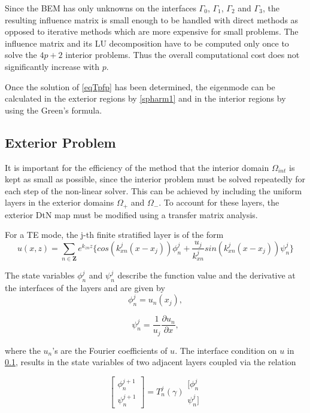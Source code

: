 Since the BEM has only unknowns on the interfaces $\Gamma_0$,
$\Gamma_1$, $\Gamma_2$ and $\Gamma_3$, the resulting influence matrix
is small enough to be handled with direct methods as opposed to
iterative methods which are more expensive for small problems. The
influence matrix and its LU decomposition have to be computed only
once to solve the $4p+2$ interior problems. Thus the overall
computational cost does not significantly increase with $p$.

Once the solution of \ref{eqTpfp} has been determined, the eigenmode can be
calculated in the exterior regions by \ref{spharm1} and in the interior
regions by using the Green's formula.

\subsection{Exterior Problem}
It is important for the efficiency of the method that the interior
domain $\Omega_{int}$ is kept as small as possible, since the interior
problem must be solved repeatedly for each step of the non-linear
solver. This can be achieved by including the uniform layers in the
exterior domains $\Omega_+$ and $\Omega_-$. To account for these
layers, the exterior DtN map must be modified using a transfer matrix
analysis.

For a TE mode, the j-th finite stratified layer is of the form
\begin{equation}
u(x,z) = \sum_{n \in \mathbf{Z}} e^{k_{zn} z} \{cos(k_{xn}^j(x-x_j))
\phi_n^j + \frac{u_j}{k_{xn}^j} sin(k_{xn}^j(x-x_j))\psi_n^j \}
\end{equation}

The state variables $\phi_n^j$ and $\psi_n^j$ describe the function
value and the derivative at the interfaces of the layers and are given
by
\begin{equation}
\phi_n^j = u_n(x_j),
\end{equation}

\begin{equation}
\psi_n^j = \frac{1}{u_j} \frac{\partial{u_n}}{\partial{x}},
\end{equation}

where the $u_n$'s are the Fourier coefficients of $u$. The interface
condition on $u$ in \ref{}, results in the state variables of two
adjacent layers coupled via the relation

\begin{equation}
\left[ \begin{array}{ll} \phi_n^{j+1} \\ \psi_n^{j+1}
\end{array} \right] = T_n^j(\gamma)
\begin{array}{ll} [\phi_n^{j} \\ \psi_n^{j}] \end{array}
\end{equation}

